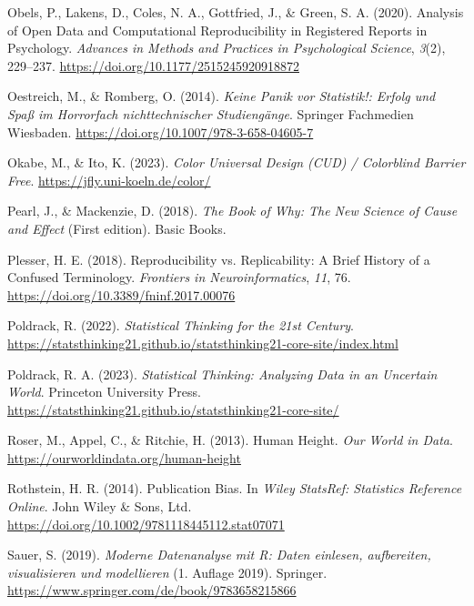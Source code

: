 \documentclass[
  a4paper,
]{scrbook}
\newlength{\cslhangindent}
\newenvironment{CSLReferences}[2] %
 {\begin{list}{}{%
  \setlength{\itemindent}{0pt}
  \setlength{\leftmargin}{0pt}
  \setlength{\parsep}{0pt}
  \ifodd #1
   \setlength{\leftmargin}{\cslhangindent}
   \setlength{\itemindent}{-1\cslhangindent}
  \fi
  \setlength{\itemsep}{#2\baselineskip}}}
 {\end{list}}
\theoremstyle{definition}
\theoremstyle{definition}
\theoremstyle{definition}
\theoremstyle{remark}
\begin{document}
\begin{CSLReferences}{1}{0}
Obels, P., Lakens, D., Coles, N. A., Gottfried, J., \& Green, S. A.
(2020). Analysis of {Open Data} and {Computational Reproducibility} in
{Registered Reports} in {Psychology}. \emph{Advances in Methods and
Practices in Psychological Science}, \emph{3}(2), 229--237.
\url{https://doi.org/10.1177/2515245920918872}

Oestreich, M., \& Romberg, O. (2014). \emph{Keine Panik vor Statistik!:
Erfolg und Spaß im Horrorfach nichttechnischer Studiengänge}. Springer
Fachmedien Wiesbaden. \url{https://doi.org/10.1007/978-3-658-04605-7}

Okabe, M., \& Ito, K. (2023). \emph{Color {Universal Design} ({CUD}) /
{Colorblind Barrier Free}}. \url{https://jfly.uni-koeln.de/color/}

Pearl, J., \& Mackenzie, D. (2018). \emph{The Book of Why: The New
Science of Cause and Effect} (First edition). Basic Books.

Plesser, H. E. (2018). Reproducibility vs. {Replicability}: {A Brief
History} of a {Confused Terminology}. \emph{Frontiers in
Neuroinformatics}, \emph{11}, 76.
\url{https://doi.org/10.3389/fninf.2017.00076}

Poldrack, R. (2022). \emph{Statistical {Thinking} for the 21st
{Century}}.
\url{https://statsthinking21.github.io/statsthinking21-core-site/index.html}

Poldrack, R. A. (2023). \emph{Statistical Thinking: Analyzing Data in an
Uncertain World}. Princeton University Press.
\url{https://statsthinking21.github.io/statsthinking21-core-site/}

Roser, M., Appel, C., \& Ritchie, H. (2013). Human Height. \emph{Our
World in Data}. \url{https://ourworldindata.org/human-height}

Rothstein, H. R. (2014). Publication {Bias}. In \emph{Wiley {StatsRef}:
{Statistics Reference Online}}. John Wiley \& Sons, Ltd.
\url{https://doi.org/10.1002/9781118445112.stat07071}

Sauer, S. (2019). \emph{Moderne Datenanalyse mit R: Daten einlesen,
aufbereiten, visualisieren und modellieren} (1. Auflage 2019). Springer.
\url{https://www.springer.com/de/book/9783658215866}


\end{CSLReferences}
\end{document}

